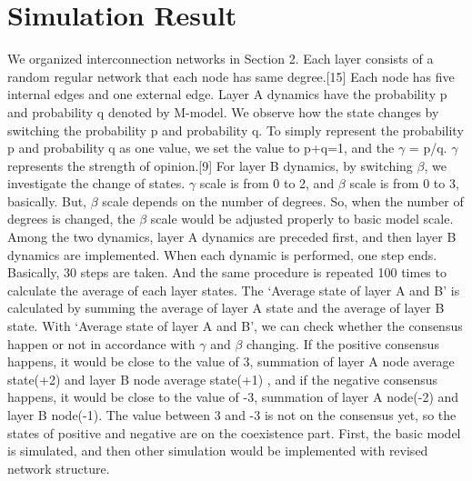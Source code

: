 \documentclass[english]{cccconf}
\begin{document}
\section{Simulation Result}
    We organized interconnection networks in Section 2. Each layer consists of a random regular network that each node has same degree.[15] Each node has five internal edges and one external edge. Layer A dynamics have the probability p and probability q denoted by M-model. We observe how the state changes by switching the probability p and probability q. To simply represent the probability p and probability q as one value, we set the value to p+q=1, and the $\gamma$ = p/q. $\gamma$ represents the strength of opinion.[9] For layer B dynamics, by switching $\beta$, we investigate the change of states. $\gamma$ scale is from 0 to 2, and $\beta$ scale is from 0 to 3, basically. But, $\beta$ scale depends on the number of degrees. So, when the number of degrees is changed, the $\beta$ scale would be adjusted properly to basic model scale.
Among the two dynamics, layer A dynamics are preceded first, and then layer B dynamics are implemented. When each dynamic is performed, one step ends. Basically, 30 steps are taken. And the same procedure is repeated 100 times to calculate the average of each layer states.
The `Average state of layer A and B' is calculated by summing the average of layer A state and the average of layer B state. With `Average state of layer A and B', we can check whether the consensus happen or not in accordance with $\gamma$ and $\beta$ changing.  If the positive consensus happens, it would be close to the value of 3, summation of layer A node average state(+2) and layer B node average state(+1) , and if the negative consensus happens, it would be close to the value of -3, summation of layer A node(-2) and layer B node(-1). The value between 3 and -3 is not on the consensus yet, so the states of positive and negative are on the coexistence part.
First, the basic model is simulated, and then other simulation would be implemented with revised network structure.
\end{document}
